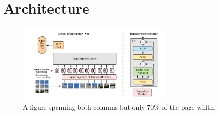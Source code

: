 \section{Architecture}

\begin{figure}[htbp]
    \centering
    \includegraphics[width=0.7\textwidth]{images/vit-architecture.png}
    \caption{A figure spanning both columns but only 70\% of the page width.}
    \label{fig:fullpage}
\end{figure}